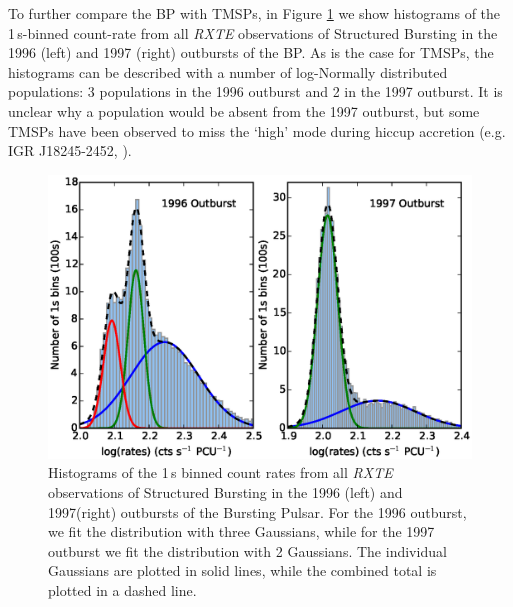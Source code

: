 %
%
%

\par To further compare the BP with TMSPs, in Figure \ref{fig:bimodal} we show histograms of the 1\,s-binned count-rate from all \textit{RXTE} observations of Structured Bursting in the 1996 (left) and 1997 (right) outbursts of the BP.  As is the case for TMSPs, the histograms can be described with a number of log-Normally distributed populations: 3 populations in the 1996 outburst and 2 in the 1997 outburst. It is unclear why a population would be absent from the 1997 outburst, but some  TMSPs have been observed to miss the `high' mode during hiccup accretion (e.g. IGR J18245-2452, \citealp{Ferrigno_TMSPVar}).

\begin{figure}
  \centering
  \includegraphics[width=.9\linewidth, trim={1.3cm 0cm 1.7cm 1.0cm},clip]{images/hist_bo.eps}
  \caption{\small  Histograms of the 1\,s binned count rates from all \textit{RXTE} observations of Structured Bursting in the 1996 (left) and 1997(right) outbursts of the Bursting Pulsar.  For the 1996 outburst, we fit the distribution with three Gaussians, while for the 1997 outburst we fit the distribution with 2 Gaussians.  The individual Gaussians are plotted in solid lines, while the combined total is plotted in a dashed line.}
  \label{fig:bimodal}
\end{figure}

